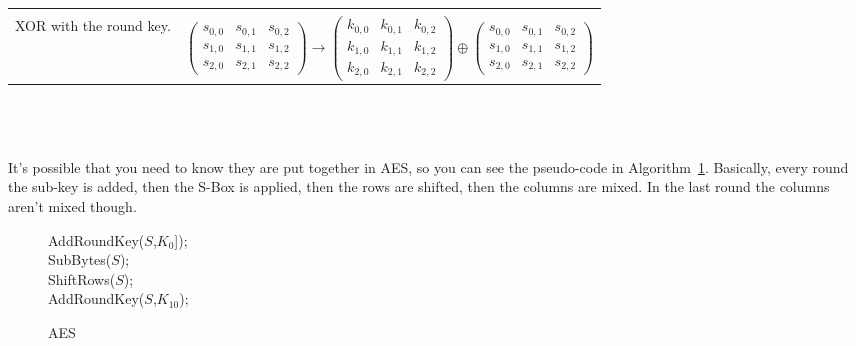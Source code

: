\begin{tabular}{ll}
        \begin{minipage}[t]{\leftminipagewidth}
            \textbf{Round Key Addition}\\
            XOR with the round key.
        \end{minipage}
        &
        \begin{minipage}[t]{\rightminipagewidth}
        $
            \begin{pmatrix}
                s_{0,0} & s_{0,1} & s_{0,2}\\
                s_{1,0} & s_{1,1} & s_{1,2}\\
                s_{2,0} & s_{2,1} & s_{2,2}
            \end{pmatrix}
            \rightarrow
            \begin{pmatrix}
                k_{0,0} & k_{0,1} & k_{0,2}\\
                k_{1,0} & k_{1,1} & k_{1,2}\\
                k_{2,0} & k_{2,1} & k_{2,2}
            \end{pmatrix}
            \oplus
            \begin{pmatrix}
                s_{0,0} & s_{0,1} & s_{0,2}\\
                s_{1,0} & s_{1,1} & s_{1,2}\\
                s_{2,0} & s_{2,1} & s_{2,2}
            \end{pmatrix}
        $
        \end{minipage}

    \end{tabular}\\\\
    \\
    It's possible that you need to know they are put together in AES, so you can see the pseudo-code in Algorithm~\ref{alg:aes}. Basically, every round the sub-key is added, then the S-Box is applied, then the rows are shifted, then the columns are mixed. In the last round the columns aren't mixed though.\\
    \begin{figure}[htp!]
        \centering
        \begin{algorithm}[H]
            \SetAlgoLined
            AddRoundKey($S$,$K_0$]);\\
            SubBytes($S$);\\
            ShiftRows($S$);\\
            AddRoundKey($S$,$K_{10}$);\\
            \caption{AES}
            \label{alg:aes}
        \end{algorithm}
    \end{figure}
